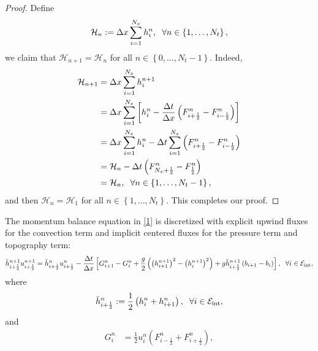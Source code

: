 \documentclass[11pt,a4paper,center,notitlepage]{article}
\numberwithin{equation}{section}
\begin{document}
\begin{proof}
Define 
\begin{align*}
{\mathcal{H}_n} := \Delta x\sum\limits_{i = 1}^{{N_x}} {h_i^n} , \hspace{2mm} \forall n \in \left\{ {1, \ldots ,{N_t}} \right\},
\end{align*}
we claim that $\mathcal{H}_{n+1} = \mathcal{H}_n$ for all $n\in \left\{0,\ldots,{N_t}-1\right\}$. Indeed,
\begin{align*}
{\mathcal{H}_{n + 1}} &= \Delta x\sum\limits_{i = 1}^{{N_x}} {h_i^{n + 1}} \\
&= \Delta x\sum\limits_{i = 1}^{{N_x}} {\left[ {h_i^n - \frac{{\Delta t}}{{\Delta x}}\left( {F_{i + \frac{1}{2}}^n - F_{i - \frac{1}{2}}^n} \right)} \right]} \\
& = \Delta x\sum\limits_{i = 1}^{{N_x}} {h_i^n}  - \Delta t\sum\limits_{i = 1}^{{N_x}} {\left( {F_{i + \frac{1}{2}}^n - F_{i - \frac{1}{2}}^n} \right)} \\
& = {\mathcal{H}_n} - \Delta t\left( {F_{{N_x} + \frac{1}{2}}^n - F_{\frac{1}{2}}^n} \right)\\
& = {\mathcal{H}_n}, \hspace{2mm} \forall n \in \left\{ {1, \ldots ,{N_t} - 1} \right\},
\end{align*}
and then $\mathcal{H}_n =\mathcal{H}_1$ for all $n \in \left\{1,\ldots,N_t\right\}$. This completes our proof.
\end{proof}
The momentum balance equation in \eqref{1} is discretized with explicit upwind fluxes for the convection term and implicit centered fluxes for the pressure term and topography term:
\begin{align}
\label{7}
\bar h_{i + \frac{1}{2}}^{n + 1}u_{i + \frac{1}{2}}^{n + 1} = \bar h_{i + \frac{1}{2}}^nu_{i + \frac{1}{2}}^n - \frac{{\Delta t}}{{\Delta x}}\left[ {G_{i + 1}^n - G_i^n + \frac{g}{2}\left( {{{\left( {h_{i + 1}^{n + 1}} \right)}^2} - {{\left( {h_i^{n + 1}} \right)}^2}} \right) + g\bar h_{i + \frac{1}{2}}^{n + 1}\left( {{b_{i + 1}} - {b_i}} \right)} \right], \hspace{2mm} \forall i \in {\mathcal{E}_{{\mathop{\rm int}} }},
\end{align}
where 
\begin{align*}
\bar h_{i + \frac{1}{2}}^n: = \frac{1}{2}\left( {h_i^n + h_{i + 1}^n} \right), \hspace{2mm} \forall i \in {\mathcal{E}_{{\mathop{\rm int}} }},
\end{align*}
and 
\begin{align*}
G_i^n &= \frac{1}{2}u_i^n\left( {F_{i - \frac{1}{2}}^n + F_{i + \frac{1}{2}}^n} \right),
\end{align*}
\end{document}
